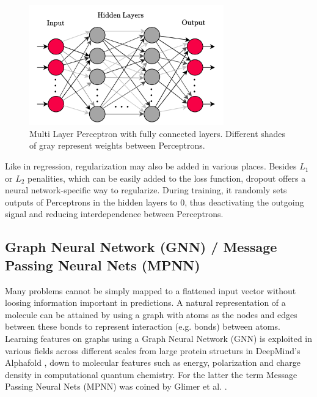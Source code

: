 \begin{figure}[h]
    \centering
    \includegraphics[width=0.75\textwidth]{../fig/background/MLP.pdf}
    \caption[Multi Layer Perceptron]{Multi Layer Perceptron with fully connected layers. Different shades of gray represent weights between Perceptrons.}
    \label{fig:mlp}
\end{figure}

Like in regression, regularization may also be added in various places. Besides $L_1$ or $L_2$ penalities, which can be easily added to the loss function, dropout offers a neural network-specific way to regularize. During training, it randomly sets outputs of Perceptrons in the hidden layers to 0, thus deactivating the outgoing signal and reducing interdependence between Perceptrons. 

\subsection{Graph Neural Network (GNN) / Message Passing Neural Nets (MPNN)}
\label{subsec:background_gnn}
Many problems cannot be simply mapped to a flattened input vector without loosing information important in predictions. A natural representation of a molecule can be attained by using a graph with atoms as the nodes and edges between these bonds to represent interaction (e.g. bonds) between atoms. Learning features on graphs using a Graph Neural Network (GNN) is exploited in various fields across different scales from large protein structurs in DeepMind's Alphafold \parencite{ref:alphafold}, down to molecular features such as energy, polarization and charge density in computational quantum chemistry. For the latter the term Message Passing Neural Nets (MPNN) was coined by Glimer et al. \parencite{ref:gilmer2017neural}.\\

